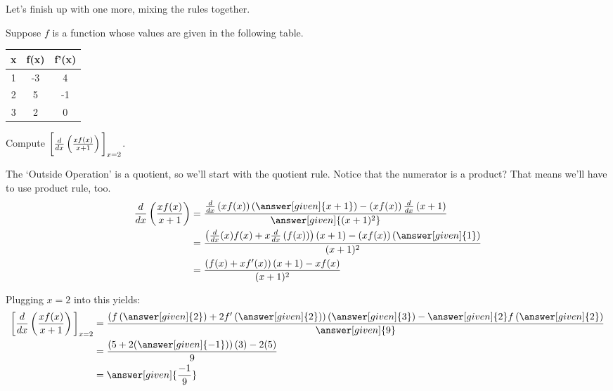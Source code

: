 \documentclass{ximera}
\begin{document}
Let's finish up with one more, mixing the rules together.
\begin{example}
	Suppose $f$ is a function whose values are given in the following table.
	\begin{center}
		\begin{tabular}{c c c}
			\hline \hline
			x & f(x) & f'(x) \\ 
			\hline
			1 & -3 & 4\\
			2 & 5 & -1\\
			3 & 2 & 0\\
			\hline
		\end{tabular}		
	\end{center}
		
	Compute $\bigg[  \frac{d}{dx}\left( \frac{x f(x)}{x+1} \right) \bigg]_{x=2}$.
	\begin{explanation}
	The `Outside Operation' is a quotient, so we'll start with the quotient rule.  Notice that the numerator is a product?  That means we'll have to use product rule, too.
	\begin{align*}
		\frac{d}{dx}\left( \frac{x f(x)}{x+1} \right) &= \frac{\frac{d}{dx}\left(x f(x)\right) \left(\answer[given]{x+1}\right) - \left( x f(x) \right) \frac{d}{dx} \left(x+1\right)}{\answer[given]{(x+1)^2}}\\
			&= \frac{\left( \frac{d}{dx}(x) f(x) + x\frac{d}{dx}\left(f(x)\right) \right) (x+1) - \left( x f(x) \right) \left( \answer[given]{1}\right)}{(x+1)^2}\\
			&= \frac{\left( f(x) + x f'(x) \right) (x+1) - x f(x)}{(x+1)^2}		
	\end{align*}
	
	Plugging $x=2$ into this yields:
	\begin{align*}
		\eval{ \frac{d}{dx}\left( \frac{x f(x)}{x+1} \right)}_{x=2} 
			&= \frac{\left( f\left(\answer[given]{2}\right) + 2 f'\left(\answer[given]{2}\right) \right) \left(\answer[given]{3}\right) - \answer[given]{2} f\left(\answer[given]{2}\right)}{\answer[given]{9}} \\
			&= \frac{\left( 5 + 2 (\answer[given]{-1})\right) (3) - 2 (5)}{9} \\
			&= \answer[given]{\frac{-1}{9}}
	\end{align*}
	\end{explanation}
\end{example}
\end{document}
